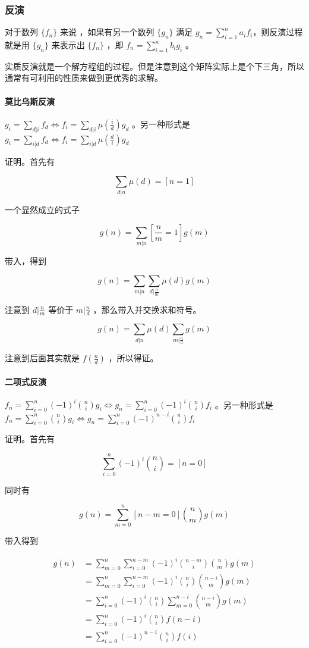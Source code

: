 \documentclass[UTF-8]{ctexart}
\begin{document}
			\subsubsection{反演}
			对于数列 $\{f_n\}$ 来说	，如果有另一个数列 $\{g_n\}$ 满足 $g_n=\sum_{i=1}^n a_i f_i$，则反演过程就是用 $\{g_n\}$ 来表示出 $\{f_n\}$ ，即 $f_n=\sum_{i=1}^n b_i g_i$ 。
			
			实质反演就是一个解方程组的过程。但是注意到这个矩阵实际上是个下三角，所以通常有可利用的性质来做到更优秀的求解。
			
			\paragraph{莫比乌斯反演} $g_i=\sum_{d|i} f_d \Leftrightarrow f_i=\sum_{d|i} \mu(\frac{i}{d}) g_d$ 。另一种形式是 $g_i=\sum_{i|d} f_d\Leftrightarrow f_i=\sum_{i|d} \mu(\frac{d}{i}) g_d$
			
			证明。首先有
			
			$$\sum_{d|n} \mu(d)=[n=1]$$
			
			一个显然成立的式子
			
			$$g(n)=\sum_{m|n} [\frac{n}{m}=1] g(m)$$
			
			带入，得到
			
			$$g(n)=\sum_{m|n}\sum_{d|\frac{n}{m}} \mu(d) g(m)$$
			
			注意到 $d|\frac{n}{m}$ 等价于 $m|\frac{n}{d}$ ，那么带入并交换求和符号。
			
			$$g(n)=\sum_{d|n}\mu(d)\sum_{m|\frac{n}{d}}g(m)$$
			
			注意到后面其实就是 $f(\frac{n}{d})$ ，所以得证。
			
			\paragraph{二项式反演} $f_n = \sum_{i=0}^n (-1)^i {n \choose i} g_i \Leftrightarrow g_n = \sum_{i=0}^n (-1)^i {n \choose i} f_i$ 。另一种形式是 $f_n = \sum_{i=0}^n {n \choose i} g_i \Leftrightarrow g_n = \sum_{i=0}^n (-1)^{n-i} {n \choose i} f_i$
			
			证明。首先有
			
			$$\sum_{i=0}^n(-1)^i\binom{n}{i}=[n=0]$$
			
			同时有
			
			$$g(n)=\sum_{m=0}^n[n-m=0]\binom{n}{m}g(m)$$
			
			带入得到
			
			\begin{align}
			g(n)&=\sum_{m=0}^n\sum_{i=0}^{n-m}(-1)^i\binom{n-m}{i}\binom{n}{m}g(m)\nonumber\\
			&=\sum_{m=0}^n\sum_{i=0}^{n-m}(-1)^i\binom{n}{i}\binom{n-i}{m}g(m)\nonumber\\
			&=\sum_{i=0}^n(-1)^i\binom{n}{i}\sum_{m=0}^{n-i}\binom{n-i}{m}g(m)\nonumber\\
			&=\sum_{i=0}^n(-1)^i\binom{n}{i}f(n-i)\nonumber\\
			&=\sum_{i=0}^n(-1)^{n-i}\binom{n}{i}f(i)\nonumber
			\end{align}
			
\end{document}
